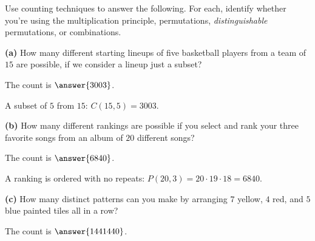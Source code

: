 \documentclass[12pt]{ximera}
\begin{document}
\begin{problem}
Use counting techniques to answer the following. For each, identify whether you're using
the multiplication principle, permutations, \emph{distinguishable} permutations, or
combinations.

\begin{prompt}
\textbf{(a)} How many different starting lineups of five basketball players from a team
of $15$ are possible, if we consider a lineup just a subset?

\begin{multipleChoice}
\end{multipleChoice}

The count is $\answer{3003}$.

\begin{feedback}
A subset of $5$ from $15$: $C(15,5)=3003$.
\end{feedback}
\end{prompt}

\begin{prompt}
\textbf{(b)} How many different rankings are possible if you select and rank your three
favorite songs from an album of $20$ different songs?

\begin{multipleChoice}
\end{multipleChoice}

The count is $\answer{6840}$.

\begin{feedback}
A ranking is ordered with no repeats: $P(20,3)=20\cdot 19\cdot 18=6840$.
\end{feedback}
\end{prompt}

\begin{prompt}
\textbf{(c)} How many distinct patterns can you make by arranging $7$ yellow, $4$ red,
and $5$ blue painted tiles all in a row?

\begin{multipleChoice}
\end{multipleChoice}

The count is $\answer{1441440}$.


\end{prompt}
\end{problem}
\end{document}
